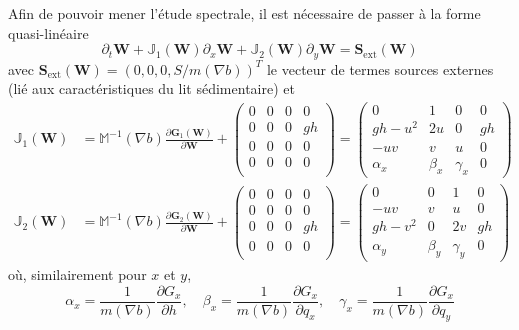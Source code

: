 \documentclass[11pt, a4paper, oneside]{report}
\begin{document}
Afin de pouvoir mener l'étude spectrale, il est nécessaire de passer à la forme quasi-linéaire
\begin{equation}
    \partial_t \bm{W} + \mathbb{J}_1(\bm{W}) \partial_x \bm{W} + \mathbb{J}_2(\bm{W}) \partial_y \bm{W} = \bm{S}_\text{ext}(\bm{W})
\end{equation}
avec $\bm{S}_\text{ext}(\bm{W}) = (0, 0, 0, S/m(\nabla b))^T$ le vecteur de termes sources externes (lié aux caractéristiques du lit sédimentaire) et
\begin{equation}
    \begin{aligned}
        \mathbb{J}_1(\bm{W}) & = \mathbb{M}^{-1}(\nabla b) \frac{\partial \bm{G}_1(\bm{W})}{\partial \bm{W}} + \begin{pmatrix}
            0 & 0 & 0 & 0 \\
            0 & 0 & 0 & gh \\
            0 & 0 & 0 & 0 \\
            0 & 0 & 0 & 0 \\
        \end{pmatrix}
        = \begin{pmatrix}
            0 & 1 & 0 & 0 \\
            gh - u^2 & 2u & 0 & gh \\
            -uv & v & u & 0 \\
            \alpha_x & \beta_x & \gamma_x & 0
        \end{pmatrix} \\
        \mathbb{J}_2(\bm{W}) & = \mathbb{M}^{-1}(\nabla b) \frac{\partial \bm{G}_2(\bm{W})}{\partial \bm{W}} + \begin{pmatrix}
            0 & 0 & 0 & 0 \\
            0 & 0 & 0 & 0 \\
            0 & 0 & 0 & gh \\
            0 & 0 & 0 & 0 \\
        \end{pmatrix}
        = \begin{pmatrix}
            0 & 0 & 1 & 0 \\
            - uv & v & u & 0 \\
            gh - v^2 & 0 & 2v & gh \\
            \alpha_y & \beta_y & \gamma_y & 0
        \end{pmatrix}
    \end{aligned}
\end{equation}
où, similairement pour $x$ et $y$,
\begin{equation}
    \alpha_x = \frac{1}{m(\nabla b)} \frac{\partial G_x}{\partial h}, \quad \beta_x = \frac{1}{m(\nabla b)} \frac{\partial G_x}{\partial q_x}, \quad \gamma_x = \frac{1}{m(\nabla b)} \frac{\partial G_x}{\partial q_y}
\end{equation}
\end{document}
